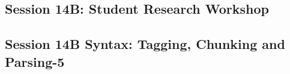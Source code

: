 \subsection{\large Session 14B: Student Research Workshop}
\label{parallel-session-14B-trackG}
\TrackGLoc\hfill\sessionchair{}{}
\clearpage
\subsection{\large Session 14B Syntax: Tagging, Chunking and Parsing-5}
\label{parallel-session-14B-trackH}
\TrackHLoc\hfill\sessionchair{}{}
\clearpage


